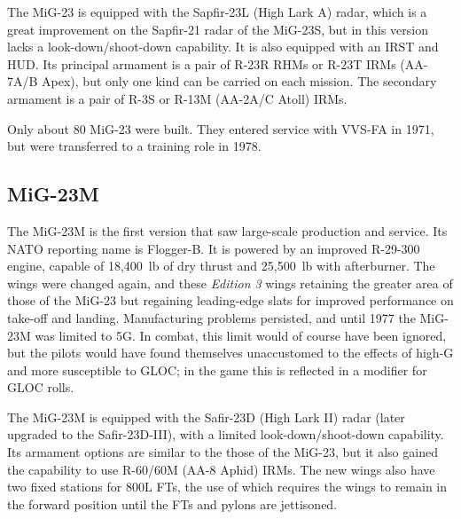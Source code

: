 The MiG-23 is equipped with the Sapfir-23L (High Lark A) radar, which is a great improvement on the Sapfir-21 radar of the MiG-23S, but in this version lacks a look-down/shoot-down capability.
It is also equipped with an IRST and HUD. Its principal armament is a pair of R-23R RHMs or R-23T IRMs (AA-7A/B Apex), but only one kind can be carried on each mission.
The secondary armament is a pair of R-3S or R-13M (AA-2A/C Atoll) IRMs.

Only about 80 MiG-23 were built. They entered service with VVS-FA in 1971, but were transferred to a training role in 1978.%
%

\subsection{MiG-23M}

The MiG-23M is the first version that saw large-scale production and service.
Its NATO reporting name is Flogger-B.
It is powered by an improved R-29-300 engine, capable of 18,400~lb of dry thrust and 25,500~lb with afterburner. The wings were changed again, and these \emph{Edition 3} wings retaining the greater area of those of the MiG-23 but regaining leading-edge slats for improved performance on take-off and landing.
Manufacturing problems persisted, and until 1977 the MiG-23M was limited to 5G. In combat, this limit would of course have been ignored, but the pilots would have found themselves unaccustomed to the effects of high-G and more susceptible to GLOC; in the game this is reflected in a  modifier for GLOC rolls.

The MiG-23M is equipped with the Safir-23D (High Lark II) radar (later upgraded to the Safir-23D-III), with a limited look-down/shoot-down capability.
Its armament options are similar to the those of the MiG-23, but it also gained the capability to use R-60/60M (AA-8 Aphid) IRMs.
The new wings also have two fixed stations for 800L FTs, the use of which requires the wings to remain in the forward position until the FTs and pylons are jettisoned.

